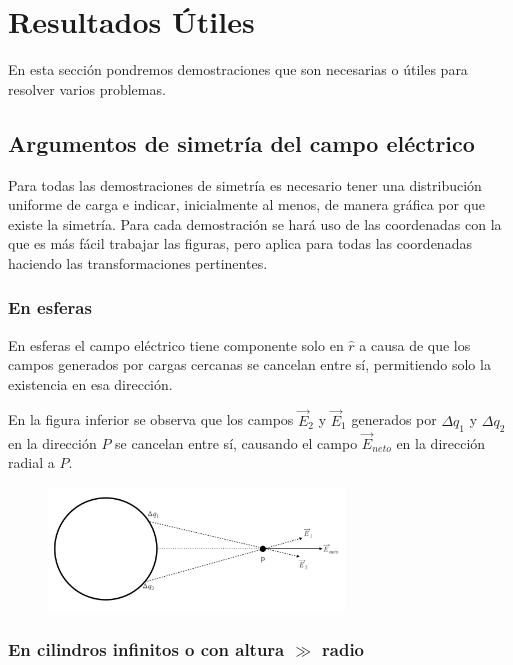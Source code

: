 \section{Resultados Útiles}

En esta sección pondremos demostraciones que son necesarias o útiles para resolver varios problemas.

\subsection{Argumentos de simetría del campo eléctrico}

Para todas las demostraciones de simetría es necesario tener una distribución uniforme de carga e indicar, inicialmente al menos, de manera gráfica por que existe la simetría. Para cada demostración se hará uso de las coordenadas con la que es más fácil trabajar las figuras, pero aplica para todas las coordenadas haciendo las transformaciones pertinentes.

\subsubsection{En esferas}

\label{SimetríaEsfera}
En esferas el campo eléctrico tiene componente solo en $\hat{r}$ a causa de que los campos generados por cargas cercanas se cancelan entre sí, permitiendo solo la existencia en esa dirección. 

En la figura inferior se observa que los campos $\Vec{E}_2$ y $\Vec{E}_1$ generados por $\Delta q_1$ y $\Delta q_2$ en la dirección $P$ se cancelan entre sí, causando el campo $\Vec{E}_{neto}$ en la dirección radial a $P$.
\begin{figure}[H]
    \centering
    \includegraphics[width=0.7\textwidth]{Resultados utiles/demost_simetria_esfera.png}
    \label{fig:simetria_esfera}
\end{figure}

\subsubsection{En cilindros infinitos o con altura $\gg$ radio}


